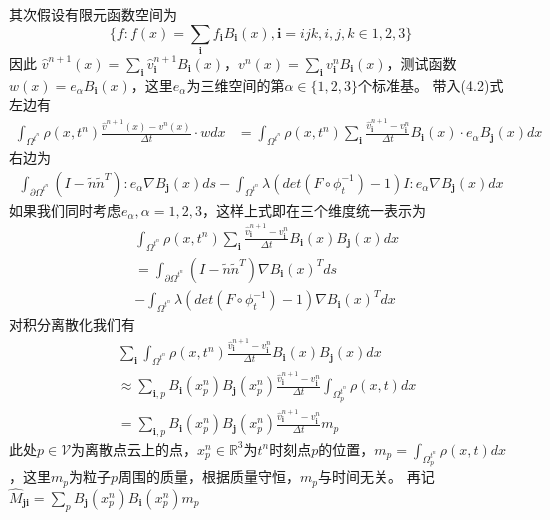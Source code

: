 其次假设有限元函数空间为$$\{f: f(x) = \sum_\mathbf{i} f_\mathbf{i} B_\mathbf{i}(x), \mathbf{i} = ijk, i,j,k\in{1,2,3}\}$$因此
$\hat{v}^{n+1}(x) = \sum_{\mathbf{i}}\hat{v}^{n+1}_{\mathbf{i}}B_{\mathbf{i}}(x)$，$v^n(x) = \sum_{\mathbf{i}}v^n_{\textbf{i}}B_{\textbf{i}}(x)$，测试函数$w(x) = e_{\alpha}B_{\mathbf{i}}(x)$，这里$e_{\alpha}$为三维空间的第$\alpha\in\{1,2,3\}$个标准基。
带入(4.2)式左边有
\begin{align}
    \int_{\Omega^{t^n}}\rho(x,t^n)\frac{\hat{v}^{n+1}(x) - v^n(x)}{\Delta t}\cdot w dx &=  \int_{\Omega^{t^n}} \rho(x,t^n)\sum_{\mathbf{i}}\frac{\hat{v}^{n+1}_\mathbf{i} - v^n_{\mathbf{i}}}{\Delta t}B_\mathbf{i}(x)\cdot e_{\alpha}B_{\mathbf{j}}(x)dx\nonumber
\end{align}
右边为
\begin{align}
    \int_{\partial \Omega^{t^n}} (I - \tilde{n}\tilde{n}^T):e_{\alpha}\nabla B_{\mathbf{j}}(x) ds - \int_{\Omega^{t^n}}\lambda (det(F\circ \phi_t^{-1}) - 1)I:e_{\alpha}\nabla B_\mathbf{j}(x) dx
\end{align}
如果我们同时考虑$e_{\alpha},\alpha = 1,2,3$，这样上式即在三个维度统一表示为
\begin{align}
    &\int_{\Omega^{t^n}}\rho(x,t^n)\sum_\mathbf{i} \frac{\hat{v}^{n+1}_\mathbf{i} - v^n_{\mathbf{i}}}{\Delta t}B_\mathbf{i}(x)B_\mathbf{j}(x)dx\nonumber\\
    &= \int_{\partial \Omega^{t^n}} (I - \tilde{n}\tilde{n}^T)\nabla B_{\mathbf{i}}(x)^T ds \nonumber\\
    & - \int_{\Omega^{t^n}} \lambda (det(F\circ \phi_t^{-1}) - 1)\nabla B_\mathbf{i}(x)^T dx
\end{align}
对积分离散化我们有
\begin{align}
    &\sum_\mathbf{i}\int_{\Omega^{t^n}}\rho(x,t^n) \frac{\hat{v}^{n+1}_\mathbf{i} - v^n_{\mathbf{i}}}{\Delta t}B_\mathbf{i}(x)B_\mathbf{j}(x)dx\nonumber\\ 
    &\approx \sum_{\mathbf{i},p}B_\mathbf{i}(x_p^n)B_\mathbf{j}(x_p^n)\frac{\hat{v}^{n+1}_\mathbf{i} - v^n_{\mathbf{i}}}{\Delta t}\int_{\Omega^{t^n}_p}\rho(x,t)dx\nonumber\\
    &= \sum_{\mathbf{i},p}B_\mathbf{i}(x_p^n)B_\mathbf{j}(x_p^n)\frac{\hat{v}^{n+1}_\mathbf{i} - v^n_{\mathbf{i}}}{\Delta t}m_p
\end{align}
此处$p\in \mathcal{V}$为离散点云上的点，$x_p^n\in \mathbb{R}^3$为$t^n$时刻点$p$的位置，$m_p = \int_{\Omega_p^{t^n}} \rho(x,t)dx$，这里$m_p$为粒子$p$周围的质量，根据质量守恒，$m_p$与时间无关。
再记$\hat{M}_{\mathbf{j}\mathbf{i}} = \sum_p B_{\mathbf{j}}(x_p^n)B_{\mathbf{i}}(x_p^n)m_p$
